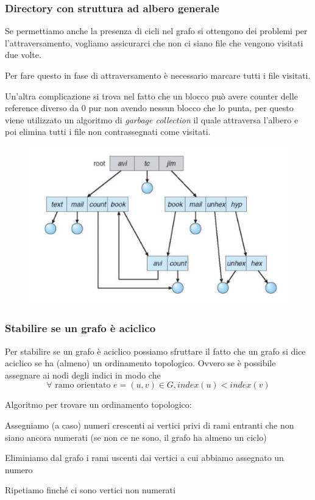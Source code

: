 \subsubsection*{Directory con struttura ad albero generale}
Se permettiamo anche la presenza di cicli nel grafo si ottengono dei problemi per l'attraversamento, vogliamo assicurarci che non ci siano file che vengono visitati due volte.

Per fare questo in fase di attraversamento è necessario marcare tutti i file visitati.

\spacer
Un'altra complicazione si trova nel fatto che un blocco può avere counter delle reference diverso da 0 pur non avendo nessun blocco che lo punta, per questo viene utilizzato un algoritmo di \textit{garbage collection} il quale attraversa l'albero e poi elimina tutti i file non contrassegnati come visitati.

\begin{figure}[H]
    \centering
    \includegraphics[width=0.42\linewidth]{assets/directory-grafo.jpg}
\end{figure}

\subsubsection*{Stabilire se un grafo è aciclico}
Per stabilire se un grafo è aciclico possiamo sfruttare il fatto che un grafo si dice aciclico se ha (almeno) un ordinamento topologico. Ovvero se è possibile assegnare ai nodi degli indici in modo che $$\forall \text{ ramo orientato } e = (u, v) \in G, index(u) < index(v)$$

Algoritmo per trovare un ordinamento topologico:
\begin{sitemize}
    \item Assegniamo (a caso) numeri crescenti ai vertici privi di rami entranti che non siano ancora numerati (se non ce ne sono, il grafo ha almeno un ciclo)
    \item Eliminiamo dal grafo i rami uscenti dai vertici a cui abbiamo assegnato un numero
    \item Ripetiamo finché ci sono vertici non numerati
\end{sitemize}

